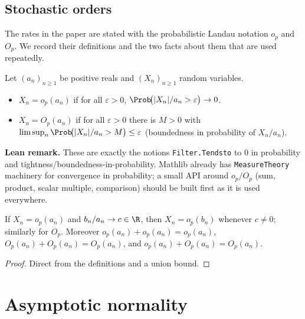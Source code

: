\section{Stochastic orders}
\label{sec:model_orders}

The rates in the paper are stated with the probabilistic Landau notation
$o_p$ and $O_p$. We record their definitions and the two facts about them that
are used repeatedly.

\begin{definition}[$o_p$ and $O_p$]\label{def:op_Op}
\leanok
Let $(a_n)_{n\ge1}$ be positive reals and $(X_n)_{n\ge1}$ random variables.
\begin{itemize}
  \item $X_n = o_p(a_n)$ if for all $\varepsilon > 0$,
        $\Prob\!\big(|X_n|/a_n > \varepsilon\big) \to 0$.
  \item $X_n = O_p(a_n)$ if for all $\varepsilon > 0$ there is $M > 0$ with
        $\limsup_n \Prob\!\big(|X_n|/a_n > M\big) \le \varepsilon$
        (boundedness in probability of $X_n / a_n$).
\end{itemize}
\end{definition}

\textbf{Lean remark.} These are exactly the notions
\texttt{Filter.Tendsto} to $0$ in probability and
tightness/boundedness-in-probability. Mathlib already has
\texttt{MeasureTheory} machinery for convergence in probability; a small
API around $o_p/O_p$ (sum, product, scalar multiple, comparison) should be
built first as it is used everywhere.

\begin{lemma}\label{lem:op_smul}
If $X_n = o_p(a_n)$ and $b_n / a_n \to c \in \R$, then $X_n = o_p(b_n)$
whenever $c \neq 0$; similarly for $O_p$. Moreover $o_p(a_n) + o_p(a_n) = o_p(a_n)$,
$O_p(a_n) + O_p(a_n) = O_p(a_n)$, and $o_p(a_n) + O_p(a_n) = O_p(a_n)$.
\end{lemma}

\begin{proof}
Direct from the definitions and a union bound.
\end{proof}


\chapter{Asymptotic normality}
\label{chap:normality}

